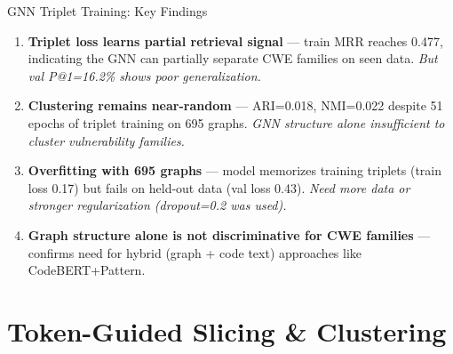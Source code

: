 \documentclass[aspectratio=169,10pt]{beamer}
\begin{document}
\begin{frame}{GNN Triplet Training: Key Findings}
  \begin{enumerate}
    \item[\textcolor{warn}{\faIcon{chart-bar}}]
      \textbf{Triplet loss learns partial retrieval signal} — train MRR reaches 0.477,
      indicating the GNN can partially separate CWE families on seen data.
      \textit{But val P@1=16.2\% shows poor generalization.}

    \vspace{0.3em}
    \item[\textcolor{miss}{\faIcon{compress-arrows-alt}}]
      \textbf{Clustering remains near-random} — ARI=0.018, NMI=0.022 despite
      51 epochs of triplet training on 695 graphs.
      \textit{GNN structure alone insufficient to cluster vulnerability families.}

    \vspace{0.3em}
    \item[\textcolor{c1}{\faIcon{lightbulb}}]
      \textbf{Overfitting with 695 graphs} — model memorizes training triplets
      (train loss 0.17) but fails on held-out data (val loss 0.43).
      \textit{Need more data or stronger regularization (dropout=0.2 was used).}

    \vspace{0.3em}
    \item[\textcolor{c3}{\faIcon{code}}]
      \textbf{Graph structure alone is not discriminative for CWE families} —
      confirms need for hybrid (graph + code text) approaches like CodeBERT+Pattern.
  \end{enumerate}
\end{frame}


\section{Token-Guided Slicing \& Clustering}
\end{document}

